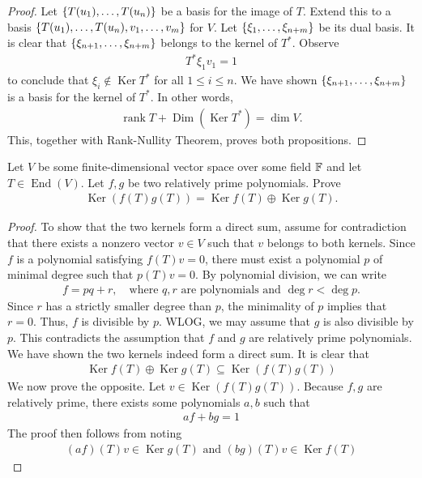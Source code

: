 \documentclass{report}
\begin{document}
\begin{proof}
Let $\{ T(u_1),\dots ,T(u_n) \}$ be a basis for the image of $T$. Extend this to a basis $\{ T(u_1),\dots ,T(u_n),v_1,\dots ,v_m \}$ for $V$. Let $\{ \xi_1,\dots ,\xi_{n+m} \}$ be its dual basis. It is clear that $\{ \xi_{n+1},\dots ,\xi_{n+m} \}$ belongs to the kernel of $T^*$. Observe  
\begin{align*}
T^*\xi_1v_1 = 1
\end{align*}
to conclude that $\xi_i \not\in \operatorname{Ker}T^*$ for all $1\leq i\leq n$. We have shown $\{ \xi_{n+1},\dots ,\xi_{n+m} \}$ is a basis for the kernel of $T^*$. In other words,  
\begin{align*}
   \operatorname{rank}T+\operatorname{Dim}(\operatorname{Ker}T^*)= \operatorname{dim}V.
\end{align*}
This, together with Rank-Nullity Theorem, proves both propositions.
\end{proof}
\begin{question}{}{}
Let $V$ be some finite-dimensional vector space over some field $\mathbb{F}$ and let $T \in \operatorname{End}(V)$. Let $f,g$ be two relatively prime polynomials. Prove 
\begin{align*}
\operatorname{Ker}(f(T)g(T))= \operatorname{Ker}f(T)\oplus \operatorname{Ker}g(T).
\end{align*}
\end{question}

\begin{proof}
To show that the two kernels form a direct sum, assume for contradiction that there exists a nonzero vector $v \in V$ such that $v$ belongs to both kernels. Since $f$ is a polynomial satisfying $f(T)v=0$, there must exist a polynomial $p$ of minimal degree such that $p(T)v=0$. By polynomial division, we can write 
\begin{align*}
f = pq + r, \quad \text{where } q, r \text{ are polynomials and } \deg r < \deg p.
\end{align*}
Since $r$ has a strictly smaller degree than $p$, the minimality of $p$ implies that $r = 0$. Thus, $f$ is divisible by $p$. WLOG, we may assume that $g$ is also divisible by $p$. This contradicts the assumption that $f$ and $g$ are relatively prime polynomials. We have shown the two kernels indeed form a direct sum. It is clear that 
\begin{align*}
\operatorname{Ker}f(T)\oplus  \operatorname{Ker}g(T)\subseteq \operatorname{Ker}(f(T)g(T)) 
\end{align*}
We now prove the opposite. Let $v \in \operatorname{Ker}(f(T)g(T))$. Because $f,g$ are relatively prime, there exists some polynomials  $a,b$ such that 
\begin{align*}
af+bg=1
\end{align*}
The proof then follows from noting 
\begin{align*}
  (af)(T)v \in \operatorname{Ker}g(T) \text{ and }(bg)(T)v \in \operatorname{Ker}f(T)
\end{align*}
\end{proof}
\end{document}
